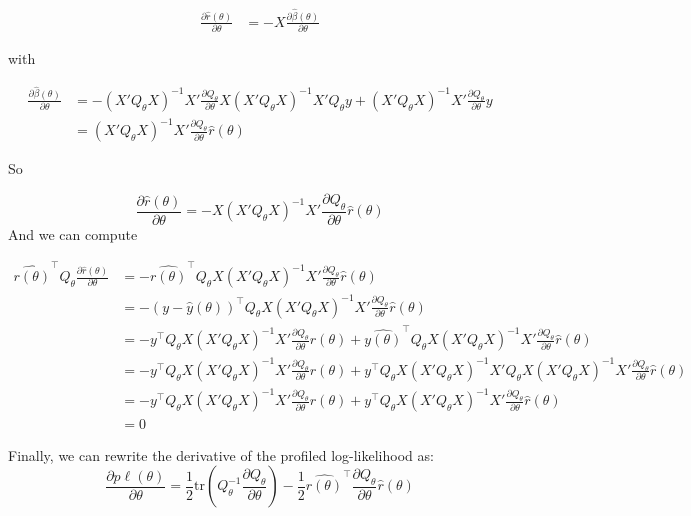 \documentclass{article}
\begin{document}
\begin{align}
\frac{\partial \hat r(\theta)}{\partial \theta} &= -X\frac{\partial \hat\beta(\theta)}{\partial \theta}
\end{align}

with

\begin{align}
  \frac{\partial \hat \beta(\theta)}{\partial \theta} &= -{(X'Q_\theta X)}^{-1}X'\frac{\partial Q_\theta}{\partial \theta}X {(X'Q_\theta X)}^{-1} X'Q_\theta y + {(X'Q_\theta X)}^{-1}X' \frac{\partial Q_\theta}{\partial \theta}y\\
&={(X'Q_\theta X)}^{-1}X'\frac{\partial Q_\theta}{\partial \theta} \hat r(\theta)
\end{align}

So

\[\frac{\partial \hat r(\theta)}{\partial \theta} = -X{(X'Q_\theta X)}^{-1}X'\frac{\partial Q_\theta}{\partial \theta} \hat r(\theta)\]
And we can compute

\begin{align*}
  \hat {r(\theta)}^\top Q_\theta \frac{\partial \hat r(\theta)}{\partial \theta} &= - \hat {r(\theta)}^\top Q_\theta X{(X'Q_\theta X)}^{-1}X'\frac{\partial Q_\theta}{\partial \theta} \hat r(\theta)\\
&= - {(y-\hat y(\theta))}^\top Q_\theta X{(X'Q_\theta X)}^{-1}X'\frac{\partial Q_\theta}{\partial \theta} \hat r(\theta)\\
&= - y^\top Q_\theta X{(X'Q_\theta X)}^{-1}X'\frac{\partial Q_\theta}{\partial \theta} \hat r(\theta)+ \hat {y(\theta)}^\top Q_\theta X{(X'Q_\theta X)}^{-1}X'\frac{\partial Q_\theta}{\partial \theta} \hat r(\theta)\\
&= - y^\top Q_\theta X{(X'Q_\theta X)}^{-1}X'\frac{\partial Q_\theta}{\partial \theta} \hat r(\theta) + y^\top Q_\theta X{(X'Q_\theta X)}^{-1}X' Q_\theta X{(X'Q_\theta X)}^{-1}X'\frac{\partial Q_\theta}{\partial \theta} \hat r(\theta)\\
&=  - y^\top Q_\theta X{(X'Q_\theta X)}^{-1}X'\frac{\partial Q_\theta}{\partial \theta} \hat r(\theta)+ y^\top Q_\theta X{(X'Q_\theta X)}^{-1}X'\frac{\partial Q_\theta}{\partial \theta} \hat r(\theta)\\
&= 0
\end{align*}



Finally, we can rewrite the derivative of the profiled log-likelihood as:
\[\frac{\partial p\ell(\theta)}{\partial \theta} = \frac{1}{2} \mathrm{tr}\left(Q_\theta^{-1} \frac{\partial Q_\theta}{\partial \theta}\right)
 -  \frac{1}{2}\hat {r(\theta)}^\top  \frac{\partial Q_\theta}{\partial \theta} \hat r(\theta) \]
\end{document}

